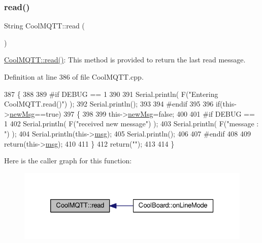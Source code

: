 \subsubsection{\texorpdfstring{read()}{read()}}
{\footnotesize\ttfamily String Cool\+M\+Q\+T\+T\+::read (\begin{DoxyParamCaption}{ }\end{DoxyParamCaption})}

\hyperlink{class_cool_m_q_t_t_ae3c18f6ae9723746d32765f1c8f176ca}{Cool\+M\+Q\+T\+T\+::read()}\+: This method is provided to return the last read message. 

Definition at line 386 of file Cool\+M\+Q\+T\+T.\+cpp.


\begin{DoxyCode}
387 \{   
388 
389 \textcolor{preprocessor}{#if DEBUG == 1 }
390 
391     Serial.println( F(\textcolor{stringliteral}{"Entering CoolMQTT.read()"}) );
392     Serial.println();
393 
394 \textcolor{preprocessor}{#endif }
395 
396     \textcolor{keywordflow}{if}(this->\hyperlink{class_cool_m_q_t_t_a3240388137b885775aadf38e96b24c6b}{newMsg}==\textcolor{keyword}{true})
397     \{
398         
399         this->\hyperlink{class_cool_m_q_t_t_a3240388137b885775aadf38e96b24c6b}{newMsg}=\textcolor{keyword}{false};
400 
401 \textcolor{preprocessor}{#if DEBUG == 1 }
402         Serial.println( F(\textcolor{stringliteral}{"received new message"}) );
403         Serial.println( F(\textcolor{stringliteral}{"message : "}) );
404         Serial.println(this->\hyperlink{class_cool_m_q_t_t_af6b19e7074dbbb4ae493c44dcb53f7ff}{msg});
405         Serial.println();
406 
407 \textcolor{preprocessor}{#endif}
408 
409         \textcolor{keywordflow}{return}(this->\hyperlink{class_cool_m_q_t_t_af6b19e7074dbbb4ae493c44dcb53f7ff}{msg});
410         
411     \}
412     \textcolor{keywordflow}{return}(\textcolor{stringliteral}{""});
413 
414 \}
\end{DoxyCode}
Here is the caller graph for this function\+:\nopagebreak
\begin{figure}[H]
\begin{center}
\leavevmode
\includegraphics[width=326pt]{d0/dd0/class_cool_m_q_t_t_ae3c18f6ae9723746d32765f1c8f176ca_icgraph}
\end{center}
\end{figure}
\mbox{\label{class_cool_m_q_t_t_a5d003307eff78efbd585e42b43b72b6d}} 
